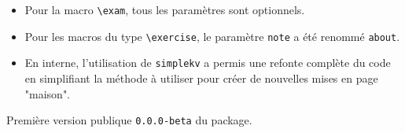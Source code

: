 \documentclass[12pt,a4paper]{scrartcl}
\theoremstyle{definition}
\begin{document}
\begin{description}[leftmargin=1em]
\begin{itemize}
        \item Pour la macro \verb+\exam+, tous les paramètres sont optionnels.

        \item Pour les macros du type \verb+\exercise+, le paramètre \verb+note+ a été renommé \verb+about+.

        \item En interne, l'utilisation de \verb+simplekv+ a permis une refonte complète du code en simplifiant la méthode à utiliser pour créer de nouvelles mises en page "maison".
    \end{itemize}

    \item[2017-11-03] Première version publique \verb+0.0.0-beta+ du package.
\end{description}
\end{document}
